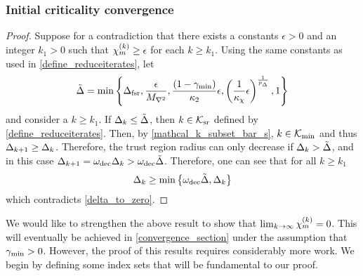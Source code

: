 \subsubsection{Initial criticality convergence}


 

\begin{proof}

Suppose for a contradiction that there exists a constants $\epsilon > 0$ and an integer $k_1 > 0$ such that ${\chi_m^{(k)}} \ge \epsilon$ for each $k \ge k_1$.
Using the same constants as used in \cref{define_reduceiterates}, let
\begin{align*}
\tilde \Delta = \min \left\{
\Delta_{\textrm{fsr}}, 
\frac{\epsilon}{{M_{\nabla^2}}}, 
\frac{(1 - \gamma_{\textrm{min}})}{{\kappa_2}} \epsilon,
\left(\frac 1 {\kappa_{\chi}} \epsilon \right)^{\frac 1 {p_{\Delta}}},
1\right\}
\end{align*}
and consider a $k \ge k_1$.
If $\Delta_k \le \tilde \Delta$, then $k \in {\mathcal K_{\textrm{sr}}}$ defined by \cref{define_reduceiterates}.
Then, by \cref{mathcal_k_subset_bar_s},  $k \in {\mathcal K_{\textrm{min}}}$ and thus $\Delta_{k+1} \ge \Delta_k$.
Therefore, the trust region radius can only decrease if $\Delta_k > \tilde \Delta$, and in this case $\Delta_{k+1} = \omega_{\text{dec}}\Delta_k > \omega_{\text{dec}} \tilde \Delta$.
Therefore, one can see that for all $k \ge k_1$
\begin{align}
\Delta_k \ge \min\left\{\omega_{\text{dec}} \tilde \Delta, \Delta_k \right\}
\end{align}
which contradicts \cref{delta_to_zero}.
\end{proof}

We would like to strengthen the above result to show that  $\lim_{k\to\infty} {\chi_m^{(k)}} = 0$.   This will eventually be achieved in \cref{convergence_section} under the assumption that $\gamma_{\textrm{min}} >0$.   However, the proof of this results requires considerably more work.     We begin by defining some index sets that will be fundamental to our proof.

